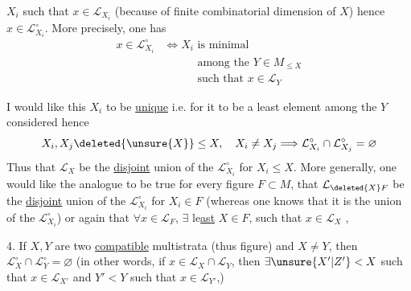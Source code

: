 $X_i$ such that $x\in\mathcal{L}_{X_i}$ (because of finite combinatorial dimension of $X$) hence $x\in \mathcal{L}_{X_i}^{\circ}$. More precisely, one has
\[
\begin{aligned}
 x\in \mathcal{L}_{X_i}^{\circ}&\Longleftrightarrow X_i\text{ is minimal}\\
 &\hspace{3em}\text{among the }Y\in M_{\leq X}\\
 &\hspace{3em}\text{such that }x\in \mathcal{L}_Y
\end{aligned}
\]

I would like this $X_i$ to be \uline{unique} i.e. for it to be a least element among the $Y$ considered hence
\[
 X_i,X_j\deleted{\unsure{X}}\leq X,\quad X_i\ne X_j\Longrightarrow \mathcal{L}_{X_i}^{\circ}\cap \mathcal{L}_{X_j}^{\circ}=\varnothing
\]
Thus that $\mathcal{L}_X$ be the \uline{disjoint} union of the $\mathcal{L}_{X_i}^{\circ}$ for $X_i\leq X$. More generally, one would like the analogue to be true for every figure $F\subset M$,  that $\mathcal{L}_{\deleted{X}F}$ be the \uline{disjoint} union of the  $\mathcal{L}_{X_i}^{\circ}$ for $X_i\in F$ (whereas one  knows that it is the union of the $\mathcal{L}_{X_i}^{\circ}$) or again that $\forall x\in \mathcal{L}_F$, $\exists$ le\uline{ast} $X\in F$, such that $x\in \mathcal{L}_X$ ,

\uline{} 4. If $X,Y$ are two \uline{compatible} multistrata (thus   figure) and $X\ne Y$, then $\mathcal{L}_X^{\circ}\cap \mathcal{L}_Y^{\circ}=\varnothing$ (in other words, if $x\in \mathcal{L}_X\cap \mathcal{L}_Y$, then  $\exists\unsure{X'|Z'}<X$ such that $x\in \mathcal{L}_{X'}$ and  $Y'<Y$ such that $x\in \mathcal{L}_{Y'}$,) 

